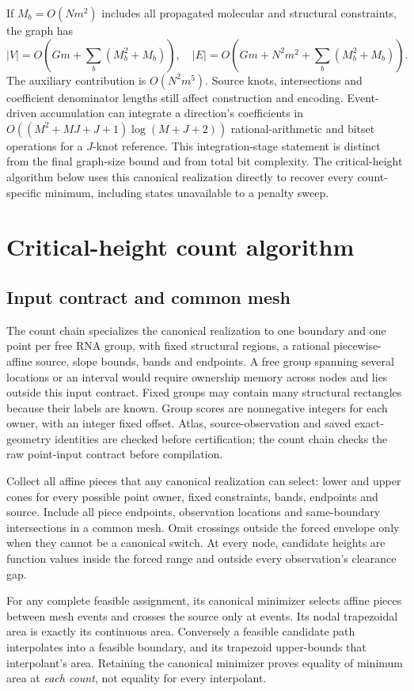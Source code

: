 \documentclass[10pt,letterpaper]{article}
\begin{document}
If $M_b=O(Nm^2)$ includes all propagated molecular and structural constraints, the graph has
\[
 |V|=O\!\left(Gm+\sum_b(M_b^2+M_b)\right),\quad
 |E|=O\!\left(Gm+N^2m^2+\sum_b(M_b^2+M_b)\right).
\]
The auxiliary contribution is $O(N^2m^5)$. Source knots, intersections and coefficient denominator lengths still affect construction and encoding. Event-driven accumulation can integrate a direction's coefficients in $O((M^2+MJ+J+1)\log(M+J+2))$ rational-arithmetic and bitset operations for a $J$-knot reference. This integration-stage statement is distinct from the final graph-size bound and from total bit complexity. The critical-height algorithm below uses this canonical realization directly to recover every count-specific minimum, including states unavailable to a penalty sweep.

\section{Critical-height count algorithm}
\subsection{Input contract and common mesh}
The count chain specializes the canonical realization to one boundary and one point per free RNA group, with fixed structural regions, a rational piecewise-affine source, slope bounds, bands and endpoints. A free group spanning several locations or an interval would require ownership memory across nodes and lies outside this input contract. Fixed groups may contain many structural rectangles because their labels are known. Group scores are nonnegative integers for each owner, with an integer fixed offset. Atlas, source-observation and saved exact-geometry identities are checked before certification; the count chain checks the raw point-input contract before compilation.

Collect all affine pieces that any canonical realization can select: lower and upper cones for every possible point owner, fixed constraints, bands, endpoints and source. Include all piece endpoints, observation locations and same-boundary intersections in a common mesh. Omit crossings outside the forced envelope only when they cannot be a canonical switch. At every node, candidate heights are function values inside the forced range and outside every observation's clearance gap.

For any complete feasible assignment, its canonical minimizer selects affine pieces between mesh events and crosses the source only at events. Its nodal trapezoidal area is exactly its continuous area. Conversely a feasible candidate path interpolates into a feasible boundary, and its trapezoid upper-bounds that interpolant's area. Retaining the canonical minimizer proves equality of minimum area at \emph{each count}, not equality for every interpolant.
\end{document}
